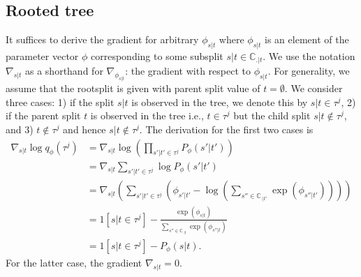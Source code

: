 \documentclass{article}
\begin{document}
\subsection*{Rooted tree}
It suffices to derive the gradient for arbitrary $\phi_{s|t}$ where $\phi_{s|t}$ is an element of the parameter vector $\phi$ corresponding to some subsplit $s|t \in \mathbb{C}_{.|t}$.
We use the notation $\nabla_{s|t}$ as a shorthand for $\nabla_{\phi_{s|t}}$: the gradient with respect to $\phi_{s|t}$.
For generality, we assume that the rootsplit is given with parent split value of $t = \emptyset$.
We consider three cases: 1) if the split $s|t$ is observed in the tree, we denote this by $s|t \in \tau^j$, 2) if the parent split $t$ is observed in the tree i.e., $t \in \tau^j$ but the child split $s|t \notin \tau^j$, and 3) $t \notin \tau^j$ and hence $s|t \notin \tau^j$.
The derivation for the first two cases is
\begin{align*}
    \nabla_{s|t} \log q_{\phi}(\tau^j) &= \nabla_{s|t} \log \left(\prod_{s'|t' \in \tau^j} P_{\phi}(s' | t') \right) \\
    &= \nabla_{s|t} \sum\limits_{s'|t' \in \tau^j} \log P_{\phi}(s' | t') \\
    &= \nabla_{s|t} \left(\sum\limits_{s'|t' \in \tau^j} \left(\phi_{s' | t'} - \log\left(\sum\limits_{s'' \in \mathbb{C}_{.|t'}} \exp(\phi_{s''|t'})\right)\right)\right) \\
    &= 1[s|t \in \tau^{j}] - \frac{\exp(\phi_{s|t})}{\sum\limits_{s'' \in \mathbb{C}_{.|t}} \exp(\phi_{s''|t})} \\
    &= 1[s|t \in \tau^{j}] - P_{\phi}(s|t).
\end{align*}
For the latter case, the gradient $\nabla_{s|t} = 0$.
\end{document}
